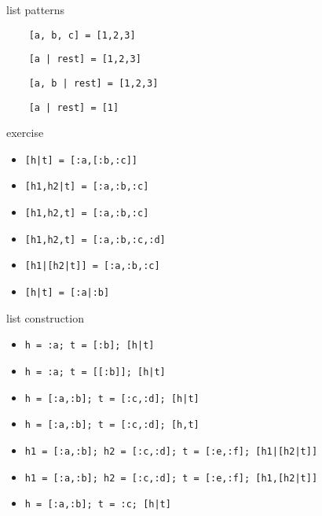 \begin{frame}[fragile]{list patterns}

  \vspace{20pt}
  \begin{lstlisting}
    [a, b, c] = [1,2,3]
  \end{lstlisting}
  \vspace{10pt}\pause
  \begin{lstlisting}
    [a | rest] = [1,2,3]
  \end{lstlisting}  

  \vspace{10pt}\pause
  \begin{lstlisting}
    [a, b | rest] = [1,2,3]
  \end{lstlisting}    

  \vspace{10pt}\pause
  \begin{lstlisting}
    [a | rest] = [1]
  \end{lstlisting}    
\end{frame}


\begin{frame}{exercise}
\begin{itemize}
\pause \item  {\tt [h|t] = [:a,[:b,:c]]}  
\pause \item  {\tt [h1,h2|t] = [:a,:b,:c]} 
\pause \item  {\tt [h1,h2,t] = [:a,:b,:c]} 
\pause \item  {\tt [h1,h2,t] = [:a,:b,:c,:d]} 
\pause \item  {\tt [h1|[h2|t]] = [:a,:b,:c]}
\pause \item  {\tt [h|t] = [:a|:b]}
\end{itemize}
\end{frame}

\begin{frame}{list construction}
\begin{itemize}
\pause \item  {\tt h = :a; t = [:b]; [h|t]}
\pause \item  {\tt h = :a; t = [[:b]]; [h|t]}
\pause \item  {\tt h = [:a,:b]; t = [:c,:d]; [h|t]}
\pause \item  {\tt h = [:a,:b]; t = [:c,:d]; [h,t]}
\pause \item  {\tt h1 = [:a,:b]; h2 = [:c,:d]; t = [:e,:f]; [h1|[h2|t]]}
\pause \item  {\tt h1 = [:a,:b]; h2 = [:c,:d]; t = [:e,:f]; [h1,[h2|t]]}
\pause \item  {\tt h = [:a,:b]; t = :c; [h|t]}
\end{itemize}
\end{frame}


